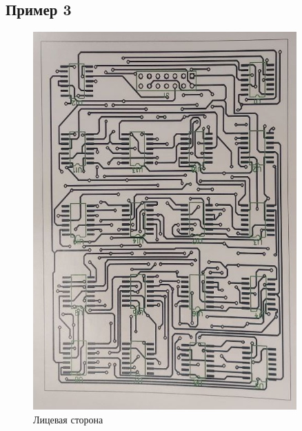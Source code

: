 \documentclass[a4paper, 12pt]{article}
\begin{document}
\newpage
\subsection{Пример 3}
\begin{figure}[h!]
	\centering
	\includegraphics[angle=180,origin=c,width=0.9\textwidth]{docs/ex2.png}
	\caption{Лицевая сторона}
\end{figure}
\end{document}
